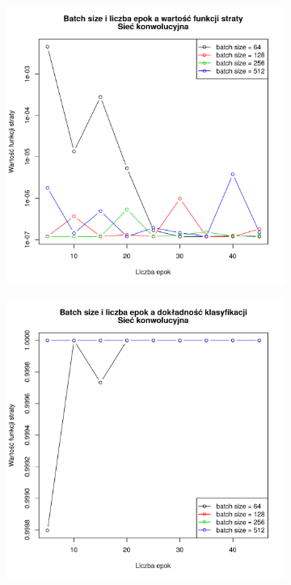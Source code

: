 \documentclass[11pt,a4paper]{article}
\begin{document}
\begin{figure}
    \centering
    \begin{subfigure}{0.45\textwidth}
        \includegraphics[width=\textwidth]{res/img/loss_conv.pdf}
    \end{subfigure}
    \qquad
    \begin{subfigure}{0.45\textwidth}
        \includegraphics[width=\textwidth]{res/img/acc_conv.pdf}

\end{subfigure}
\end{figure}
\end{document}
